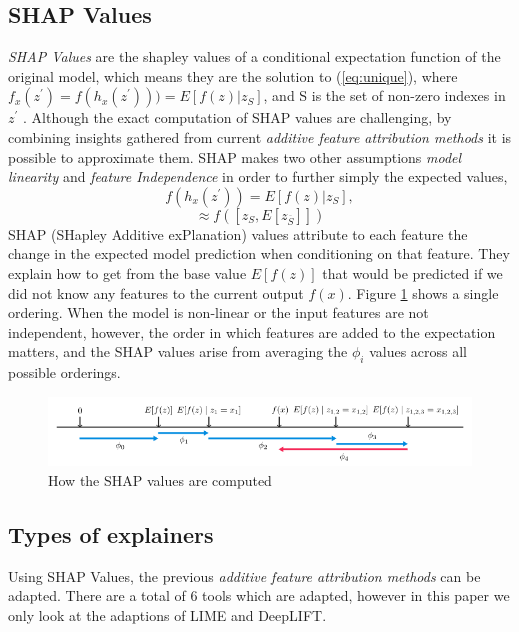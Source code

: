 \subsection{SHAP Values}
\emph{SHAP Values} are the shapley values of a conditional expectation function of the original model, which means they are the solution to (\ref{eq:unique}), where $f_{x}(z^{'}) = f(h_{x}(z^{'}))) = E[f(z) | z_{S}]$, and S is the set of non-zero indexes in $z^{'}$ \cite{NIPS2017_7062}. Although the exact computation of SHAP values are challenging, by combining insights gathered from current \emph{additive feature attribution methods} it is possible to approximate them.
SHAP makes two other assumptions  \emph{model linearity} and \emph{feature Independence} in order to further simply the expected values,
\begin{equation*}
f(h_{x}(z^{'})) = E[f(z) | z_{S}],
\end{equation*}
\begin{equation}
\approx f([z_{S}, E[z_{\overline{S}}]])
\label{eq:summarized-unique}
\end{equation}
SHAP (SHapley Additive exPlanation) values attribute to each feature the change in the expected model prediction when conditioning on that feature.  They explain how to get from the base value $E[f(z)]$ that would be predicted if we did not know any features to the current output $f(x)$. Figure \ref{fig:shap-values} shows a single ordering. When the model is non-linear or the input features are not independent, however, the order in which features are added to the expectation matters, and the SHAP values arise from averaging the $\phi_{i}$ values across all possible orderings. \cite{NIPS2017_7062}

\begin  {figure} [!htbp]
  \includegraphics[width=\linewidth]{Evaluation_Images/Shap_values.png}
  \caption{How the SHAP values are computed\cite{NIPS2017_7062}}
  \label{fig:shap-values}
\end{figure}

\subsection{Types of explainers}
Using SHAP Values, the previous \emph{additive feature attribution methods} can be adapted. There are a total of 6 tools which are adapted, however in this paper we only look at the adaptions of LIME and DeepLIFT\cite{DBLP:journals/corr/ShrikumarGK17}\cite{DBLP:journals/corr/ShrikumarGSK16}.

